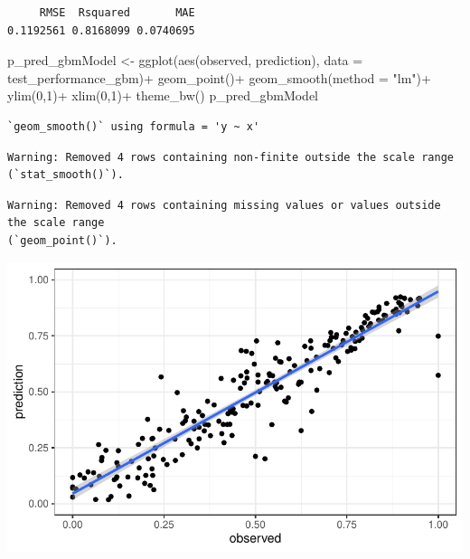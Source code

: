 \documentclass[
  letterpaper,
  DIV=11,
  numbers=noendperiod]{scrartcl}
\newenvironment{Shaded}{\begin{snugshade}}{\end{snugshade}}
\newcommand{\AttributeTok}[1]{\textcolor[rgb]{0.40,0.45,0.13}{#1}}
\newcommand{\DecValTok}[1]{\textcolor[rgb]{0.68,0.00,0.00}{#1}}
\newcommand{\FunctionTok}[1]{\textcolor[rgb]{0.28,0.35,0.67}{#1}}
\newcommand{\NormalTok}[1]{\textcolor[rgb]{0.00,0.23,0.31}{#1}}
\newcommand{\OtherTok}[1]{\textcolor[rgb]{0.00,0.23,0.31}{#1}}
\newcommand{\SpecialCharTok}[1]{\textcolor[rgb]{0.37,0.37,0.37}{#1}}
\newcommand{\StringTok}[1]{\textcolor[rgb]{0.13,0.47,0.30}{#1}}
\begin{document}
\begin{verbatim}
     RMSE  Rsquared       MAE 
0.1192561 0.8168099 0.0740695 
\end{verbatim}

\begin{Shaded}
\begin{Highlighting}[]
\NormalTok{p\_pred\_gbmModel }\OtherTok{\textless{}{-}} \FunctionTok{ggplot}\NormalTok{(}\FunctionTok{aes}\NormalTok{(observed, prediction), }\AttributeTok{data =}\NormalTok{ test\_performance\_gbm)}\SpecialCharTok{+}
    \FunctionTok{geom\_point}\NormalTok{()}\SpecialCharTok{+}
    \FunctionTok{geom\_smooth}\NormalTok{(}\AttributeTok{method =} \StringTok{"lm"}\NormalTok{)}\SpecialCharTok{+}
    \FunctionTok{ylim}\NormalTok{(}\DecValTok{0}\NormalTok{,}\DecValTok{1}\NormalTok{)}\SpecialCharTok{+}
    \FunctionTok{xlim}\NormalTok{(}\DecValTok{0}\NormalTok{,}\DecValTok{1}\NormalTok{)}\SpecialCharTok{+}
    \FunctionTok{theme\_bw}\NormalTok{()}
\NormalTok{p\_pred\_gbmModel}
\end{Highlighting}
\end{Shaded}

\begin{verbatim}
`geom_smooth()` using formula = 'y ~ x'
\end{verbatim}

\begin{verbatim}
Warning: Removed 4 rows containing non-finite outside the scale range
(`stat_smooth()`).
\end{verbatim}

\begin{verbatim}
Warning: Removed 4 rows containing missing values or values outside the scale range
(`geom_point()`).
\end{verbatim}

\includegraphics{MachineLearning_StaticPatterNN_Report_files/figure-pdf/final-models-gbm-1.pdf}
\end{document}
